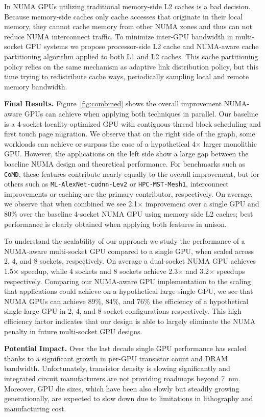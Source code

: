 \documentclass{sig-alternate}
\begin{document}
In NUMA GPUs utilizing traditional memory-side L2 caches is a bad decision. Because memory-side caches only cache accesses that originate in their local memory, they cannot cache memory from other NUMA zones and thus can
not reduce NUMA interconnect traffic. To minimize inter-GPU bandwidth in multi-socket GPU systems we propose processor-side L2 cache and NUMA-aware cache partitioning algorithm applied to both L1 and L2 caches. This cache partitioning policy relies on the same mechanism as adaptive link distribution policy, but this time trying to redistribute cache ways, periodically sampling local and remote memory bandwidth.


\textbf{Final Results. }Figure~\ref{fig:combined} shows the overall improvement NUMA-aware GPUs can achieve when applying both techniques in parallel. Our baseline is a 4-socket locality-optimized GPU with contiguous thread block scheduling and first touch page migration. We observe that on the right side of the graph, some workloads can achieve or surpass the case of a hypothetical 4$\times$ larger monolithic GPU. However, the applications on the left side show a large gap between the baseline NUMA design and theoretical performance. For benchmarks such as \texttt{CoMD}, these features contribute nearly equally to the overall improvement, but for others such as \texttt{ML-AlexNet-cudnn-Lev2} or \texttt{HPC-MST-Mesh1}, interconnect improvements or caching are the primary contributor, respectively. On average, we observe that when combined we see
2.1$\times$ improvement over a single GPU and 80\% over the baseline 4-socket NUMA GPU using memory side L2 caches; best performance is clearly obtained when applying both features in unison.

To understand the scalability of our approach we study the performance of a NUMA-aware multi-socket GPU compared to a single GPU, when scaled across 2, 4, and 8 sockets, respectively. On average a dual-socket NUMA GPU achieves
1.5$\times$ speedup, while 4 sockets and 8 sockets achieve 2.3$\times$ and 3.2$\times$ speedups respectively. Comparing our NUMA-aware GPU implementation to the scaling that applications could achieve on a hypothetical large single GPU, we see that NUMA GPUs can achieve 89\%, 84\%, and 76\% the efficiency of a hypothetical single large GPU in 2, 4, and 8 socket configurations respectively. This high efficiency factor indicates that our design is able to largely
eliminate the NUMA penalty in future multi-socket GPU designs.


\textbf{Potential Impact.} Over the last decade single GPU performance has scaled thanks to a significant growth in per-GPU transistor count and DRAM bandwidth. Unfortunately, transistor density is slowing significantly and integrated circuit manufacturers are not providing roadmaps beyond \SI{7}{nm}. Moreover, GPU die sizes, which have been also slowly but steadily growing generationally, are expected to slow down due to limitations in lithography and manufacturing cost.
\end{document}
